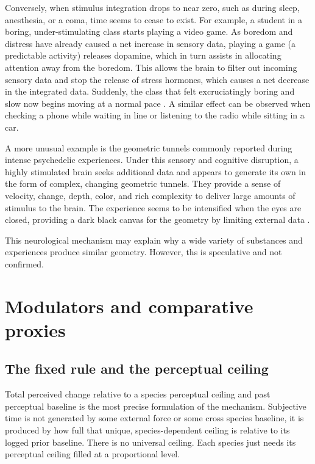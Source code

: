 \documentclass[11pt,a4paper]{article}
\begin{document}
Conversely, when stimulus integration drops to near zero, such as during sleep, anesthesia, or a coma, time seems to cease to exist. For example, a student in a boring, under-stimulating class starts playing a video game. As boredom and distress have already caused a net increase in sensory data, playing a game (a predictable activity) releases dopamine, which in turn assists in allocating attention away from the boredom. This allows the brain to filter out incoming sensory data and stop the release of stress hormones, which causes a net decrease in the integrated data. Suddenly, the class that felt excruciatingly boring and slow now begins moving at a normal pace \citep{qiu2018rapid}. A similar effect can be observed when checking a phone while waiting in line or listening to the radio while sitting in a car.

A more unusual example is the geometric tunnels commonly reported during intense psychedelic experiences. Under this sensory and cognitive disruption, a highly stimulated brain seeks additional data and appears to generate its own in the form of complex, changing geometric tunnels. They provide a sense of velocity, change, depth, color, and rich complexity to deliver large amounts of stimulus to the brain. The experience seems to be intensified when the eyes are closed, providing a dark black canvas for the geometry by limiting external data \citep{kluver1928mescal}.

This neurological mechanism may explain why a wide variety of substances and experiences produce similar geometry. However, ths is speculative and not confirmed.

\section{Modulators and comparative proxies}

\subsection{The fixed rule and the perceptual ceiling}

Total perceived change relative to a species perceptual ceiling and past perceptual baseline is the most precise formulation of the mechanism. Subjective time is not generated by some external force or some cross species baseline, it is produced by how full that unique, species-dependent ceiling is relative to its logged prior baseline. There is no universal ceiling. Each species just needs its perceptual ceiling filled at a proportional level.
\end{document}
